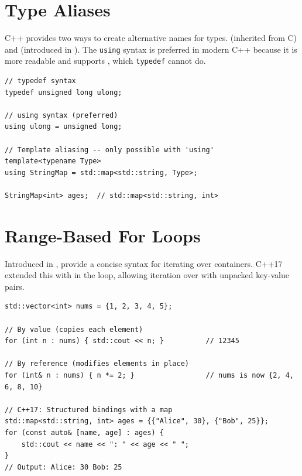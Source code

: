 \section{Type Aliases}
C++ provides two ways to create alternative names for types.  (inherited from C) and  (introduced in ). The \texttt{using} syntax is preferred in modern C++ because it is more readable and supports , which \texttt{typedef} cannot do.
\begin{lstlisting}
// typedef syntax
typedef unsigned long ulong;

// using syntax (preferred)
using ulong = unsigned long;

// Template aliasing -- only possible with 'using'
template<typename Type>
using StringMap = std::map<std::string, Type>;

StringMap<int> ages;  // std::map<std::string, int>
\end{lstlisting}

\section{Range-Based For Loops}
Introduced in ,  provide a concise syntax for iterating over containers. C++17 extended this with  in the loop, allowing iteration over  with unpacked key-value pairs.
\begin{lstlisting}
std::vector<int> nums = {1, 2, 3, 4, 5};

// By value (copies each element)
for (int n : nums) { std::cout << n; }          // 12345

// By reference (modifies elements in place)
for (int& n : nums) { n *= 2; }                 // nums is now {2, 4, 6, 8, 10}

// C++17: Structured bindings with a map
std::map<std::string, int> ages = {{"Alice", 30}, {"Bob", 25}};
for (const auto& [name, age] : ages) {
    std::cout << name << ": " << age << " ";
}
// Output: Alice: 30 Bob: 25
\end{lstlisting}

